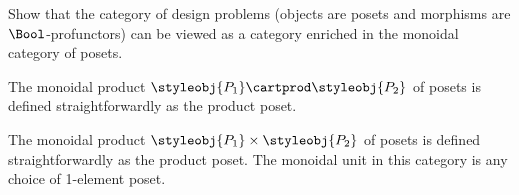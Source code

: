 \begin{gradedexercise}
    \label{ex:DPIsEnrichedInPos}
    Show that the category of design problems (objects are posets and morphisms are $\Bool$-profunctors) can be viewed as a category enriched in the monoidal category of posets.



    The monoidal product $\styleobj{P_1} \cartprod \styleobj{P_2}$ of posets is defined straightforwardly as the product poset.



    The monoidal product $\styleobj{P_1} \times \styleobj{P_2}$ of posets is defined straightforwardly as the product poset.
    The monoidal unit in this category is any choice of 1-element poset.
\end{gradedexercise}

